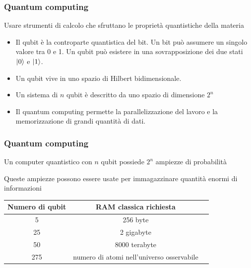 \documentclass{beamer}
\begin{document}
	\begin{frame}
		\frametitle{Quantum computing}
	
		Usare strumenti di calcolo che sfruttano le proprietà quantistiche della materia

		\begin{itemize}
			\item Il qubit è la controparte quantistica del bit. Un bit può assumere un 
			singolo valore tra 0 e 1. Un qubit può esistere in una sovrapposizione dei 
			due stati $\ket{0}$ e $\ket{1}$. 
			\item Un qubit vive in uno spazio di Hilbert bidimensionale. 
			\item Un sistema di $n$ qubit è descritto da uno spazio di dimensione $2^n$ 
			\item Il quantum computing permette la parallelizzazione del lavoro e la 
			memorizzazione di grandi quantità di dati. 
		\end{itemize}
	
	\end{frame}

	\begin{frame}
		\frametitle{Quantum computing}
	
		Un computer quantistico con $n$ qubit possiede $2^n$ ampiezze di probabilità

		Queste ampiezze possono essere usate per immagazzinare quantità enormi di informazioni

		\vspace{1cm}

		\begin{tabular}{c c c}
			Numero di qubit & RAM classica richiesta \\ 
			\hline
			5 & 256 byte \\
			25 & 2 gigabyte \\
			50 & 8000 terabyte \\
			275 & numero di atomi nell'universo osservabile
		\end{tabular}
		
		
	\end{frame}
\end{document}
